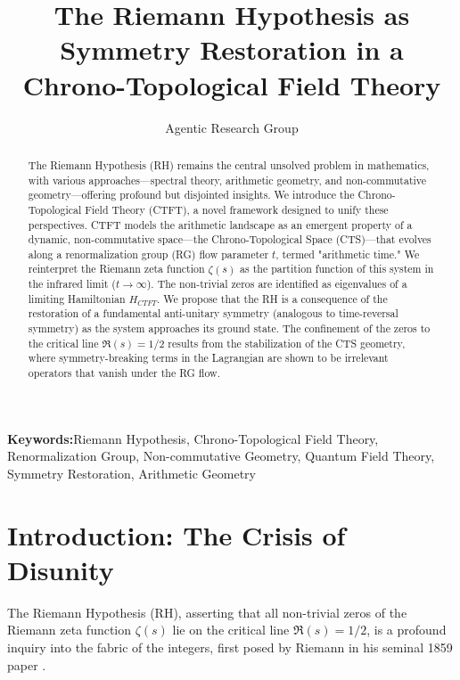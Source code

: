 \documentclass[11pt, a4paper]{article}
\title{The Riemann Hypothesis as Symmetry Restoration in a Chrono-Topological Field Theory}
\author{Agentic Research Group}
\date{}
\theoremstyle{definition}
\newcommand{\keywords}[1]{\par\addvspace\baselineskip\noindent\textbf{Keywords:}\enspace\ignorespaces#1}
\begin{document}
\maketitle

\begin{abstract}
The Riemann Hypothesis (RH) remains the central unsolved problem in mathematics, with various approaches—spectral theory, arithmetic geometry, and non-commutative geometry—offering profound but disjointed insights. We introduce the Chrono-Topological Field Theory (CTFT), a novel framework designed to unify these perspectives. CTFT models the arithmetic landscape as an emergent property of a dynamic, non-commutative space—the Chrono-Topological Space (CTS)—that evolves along a renormalization group (RG) flow parameter $t$, termed "arithmetic time." We reinterpret the Riemann zeta function $\zeta(s)$ as the partition function of this system in the infrared limit ($t\to\infty$). The non-trivial zeros are identified as eigenvalues of a limiting Hamiltonian $H_{CTFT}$. We propose that the RH is a consequence of the restoration of a fundamental anti-unitary symmetry (analogous to time-reversal symmetry) as the system approaches its ground state. The confinement of the zeros to the critical line $\Re(s) = 1/2$ results from the stabilization of the CTS geometry, where symmetry-breaking terms in the Lagrangian are shown to be irrelevant operators that vanish under the RG flow.
\end{abstract}

\keywords{Riemann Hypothesis, Chrono-Topological Field Theory, Renormalization Group, Non-commutative Geometry, Quantum Field Theory, Symmetry Restoration, Arithmetic Geometry}

\tableofcontents

\section{Introduction: The Crisis of Disunity}
The Riemann Hypothesis (RH), asserting that all non-trivial zeros of the Riemann zeta function $\zeta(s)$ lie on the critical line $\Re(s) = 1/2$, is a profound inquiry into the fabric of the integers, first posed by Riemann in his seminal 1859 paper \cite{Riemann1859}.
\end{document}
